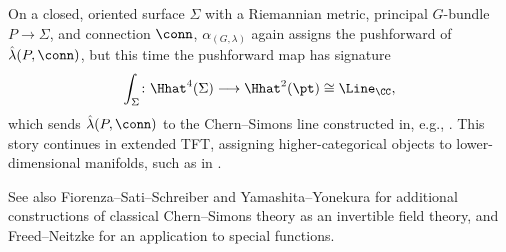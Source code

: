 \begin{example}
On a closed, oriented surface $\Sigma$ with a Riemannian metric, principal $G$-bundle $P\to\Sigma$, and connection
$\conn$, $\alpha_{(G, \lambda)}$ again assigns the pushforward of $\hat \lambda(P, \conn)$, but this time the
pushforward map has signature
\begin{equation}
\int_\Sigma\colon \Hhat^4(\Sigma)\longrightarrow \Hhat^2(\pt)\cong\Line_\CC,
\end{equation}
which sends $\hat \lambda(P, \conn)$ to the Chern--Simons line constructed in, e.g., \cite[\S 4]{Fre95}. This
story continues in extended TFT, assigning higher-categorical objects to lower-dimensional manifolds, such as
in \cite{Gom01a}.

See also Fiorenza--Sati--Schreiber \cite{FSS15a} and Yamashita--Yonekura \cite[Example 4.81 and Proposition
6.3]{YY21} for additional constructions of classical Chern--Simons theory as an invertible field theory, and
Freed--Neitzke \cite{FN20} for an application to special functions.
\end{example}
